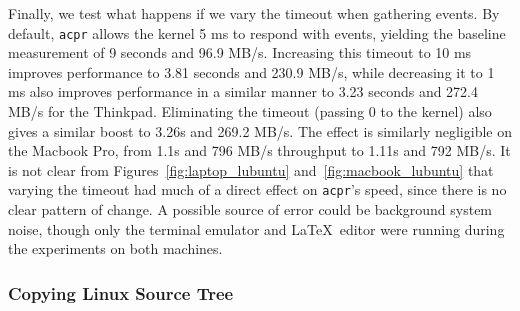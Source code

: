 \documentclass[11pt]{article}
\begin{document}
Finally, we test what happens if we vary the timeout when gathering events. By
default, \texttt{acpr} allows the kernel 5 ms to respond with events, yielding
the baseline measurement of 9 seconds and 96.9 MB/s. Increasing this timeout to
10 ms improves performance to 3.81 seconds and 230.9 MB/s, while decreasing it
to 1 ms also improves performance in a similar manner to 3.23 seconds and 272.4
MB/s for the Thinkpad. Eliminating the timeout (passing 0 to the kernel) also
gives a similar boost to 3.26s and 269.2 MB/s. The effect is similarly
negligible on the Macbook Pro, from 1.1s and 796 MB/s throughput to 1.11s and
792 MB/s. It is not clear from Figures~\ref{fig:laptop_lubuntu}
and~\ref{fig:macbook_lubuntu} that varying the timeout had much of a direct effect
on \texttt{acpr}'s speed, since there is no clear pattern of change. A possible
source of error could be background system noise, though only the terminal
emulator and \LaTeX \ editor were running during the experiments on both
machines.

\subsubsection{Copying Linux Source Tree} \label{ssubsec:laptops_linux}
\end{document}
